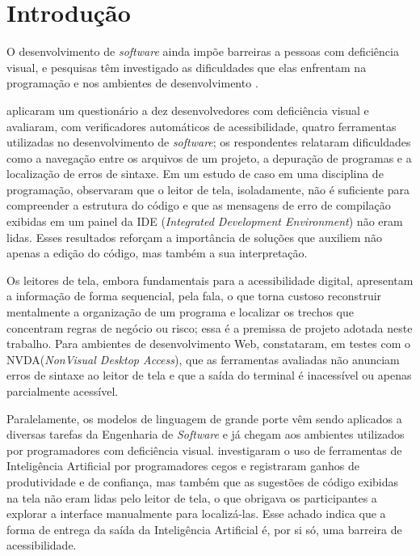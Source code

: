 \documentclass[
    12pt,                   %
    openright,              %
    oneside,                %
    a4paper,                %
    sumario=tradicional,    %
    english,                %
    brazil,                 %
    ]{abntex2}
\begin{document}
\tableofcontents*
\cleardoublepage

\textual

\chapter{Introdução}\label{sec:introducao}

O desenvolvimento de \textit{software} ainda impõe barreiras a pessoas com deficiência visual, e pesquisas têm investigado as dificuldades que elas enfrentam na programação e nos ambientes de desenvolvimento \cite{acad54431201,latinoware20457}.

\textcite{latinoware20457} aplicaram um questionário a dez desenvolvedores com deficiência visual e avaliaram, com verificadores automáticos de acessibilidade, quatro ferramentas utilizadas no desenvolvimento de \textit{software}; os respondentes relataram dificuldades como a navegação entre os arquivos de um projeto, a depuração de programas e a localização de erros de sintaxe. Em um estudo de caso em uma disciplina de programação, \textcite{acad54431201} observaram que o leitor de tela, isoladamente, não é suficiente para compreender a estrutura do código e que as mensagens de erro de compilação exibidas em um painel da IDE (\textit{Integrated Development Environment}) não eram lidas. Esses resultados reforçam a importância de soluções que auxiliem não apenas a edição do código, mas também a sua interpretação.

Os leitores de tela, embora fundamentais para a acessibilidade digital, apresentam a informação de forma sequencial, pela fala, o que torna custoso reconstruir mentalmente a organização de um programa e localizar os trechos que concentram regras de negócio ou risco; essa é a premissa de projeto adotada neste trabalho. Para ambientes de desenvolvimento Web, \textcite{latinoware6969} constataram, em testes com o NVDA(\textit{NonVisual Desktop Access}), que as ferramentas avaliadas não anunciam erros de sintaxe ao leitor de tela e que a saída do terminal é inacessível ou apenas parcialmente acessível.

Paralelamente, os modelos de linguagem de grande porte vêm sendo aplicados a diversas tarefas da Engenharia de \textit{Software} \cite{hou2024llmse} e já chegam aos ambientes utilizados por programadores com deficiência visual. \textcite{latinoware34224} investigaram o uso de ferramentas de Inteligência Artificial por programadores cegos e registraram ganhos de produtividade e de confiança, mas também que as sugestões de código exibidas na tela não eram lidas pelo leitor de tela, o que obrigava os participantes a explorar a interface manualmente para localizá-las. Esse achado indica que a forma de entrega da saída da Inteligência Artificial é, por si só, uma barreira de acessibilidade.
\end{document}
